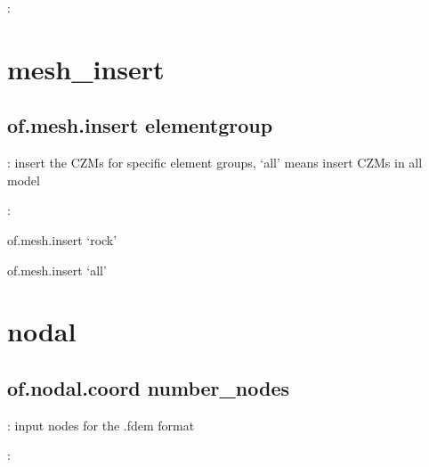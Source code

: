 \documentclass[letterpaper,10pt,english]{sphinxmanual}
\begin{document}
:

\begin{sphinxVerbatim}[commandchars=\\\{\}]
 
\end{sphinxVerbatim}


\chapter{mesh\_insert}
\label{\detokenize{rst_tutorials/command_line_guide:mesh-insert}}

\section{of.mesh.insert elementgroup}
\label{\detokenize{rst_tutorials/command_line_guide:of-mesh-insert-elementgroup}}
: insert the CZMs for specific element groups, ‘all’ means insert
CZMs in all model

:

\begin{sphinxVerbatim}[commandchars=\\\{\}]
of.mesh.insert ‘rock’

of.mesh.insert ‘all’
\end{sphinxVerbatim}


\chapter{nodal}
\label{\detokenize{rst_tutorials/command_line_guide:nodal}}

\section{of.nodal.coord number\_nodes}
\label{\detokenize{rst_tutorials/command_line_guide:of-nodal-coord-number-nodes}}
: input nodes for the .fdem format

:

\begin{sphinxVerbatim}[commandchars=\\\{\}]
 

   

   

   
\end{sphinxVerbatim}
\end{document}
